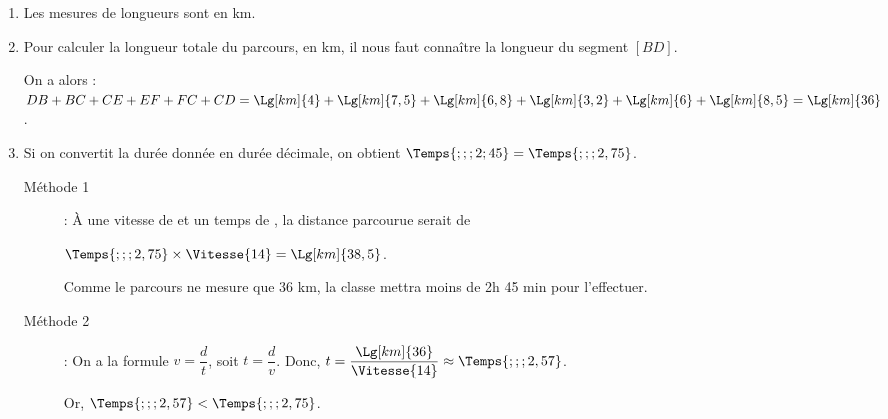 \begin{enumerate}
    \item Les mesures de longueurs sont en km.
    \item Pour calculer la longueur totale du parcours, en km, il nous faut connaître la longueur du segment $[BD]$. \par
       On a alors : $DB+BC+CE+EF+FC+CD =\Lg[km]{4}+\Lg[km]{7,5}+\Lg[km]{6,8}+\Lg[km]{3,2}+\Lg[km]{6}+\Lg[km]{8,5} =\Lg[km]{36}$. \par
    \item Si on convertit la durée donnée en durée décimale, on obtient $\Temps{;;;2;45} =\Temps{;;;2,75}$.
       \begin{description}
          \item[Méthode 1] : 
             À une vitesse de  et un temps de , la distance parcourue serait de \par
             $\Temps{;;;2,75}\times\Vitesse{14} =\Lg[km]{38,5}$. \par
             Comme le parcours ne mesure que 36 km, la classe mettra moins de 2h 45 min pour l'effectuer.
          \item[Méthode 2] : On a la formule $v =\dfrac{d}{t}$, soit $t =\dfrac{d}{v}$. Donc, $t =\dfrac{\Lg[km]{36}}{\Vitesse{14}} \approx\Temps{;;;2,57}$. \par
             Or, $\Temps{;;;2,57}<\Temps{;;;2,75}$.
       \end{description}
 \end{enumerate}